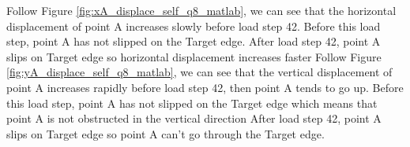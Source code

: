 \vspace{0.38cm} \newline
Follow Figure \ref{fig:xA_displace_self_q8_matlab}, we can see that 
the horizontal displacement of point A increases slowly before load step 42.
Before this load step, point A has not slipped on the Target edge.
After load step 42, point A slips on Target edge so horizontal displacement increases faster
\vspace{0.38cm} \newline
Follow Figure \ref{fig:yA_displace_self_q8_matlab}, we can see that
the vertical displacement of point A increases rapidly before load step 42,
then point A tends to go up.
Before this load step, point A has not slipped on the Target edge 
which means that point A is not obstructed in the vertical direction
After load step 42, point A slips on Target edge so point A can't go through the Target edge.
